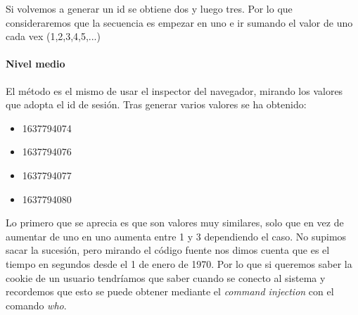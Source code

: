 Si volvemos a generar un id se obtiene dos y luego tres. Por lo que consideraremos que la secuencia es empezar en uno
e ir sumando el valor de uno cada vex (1,2,3,4,5,...)
\paragraph{Nivel medio}  El método es el mismo de usar el inspector del navegador, mirando los valores que adopta el id de 
sesión. Tras generar varios valores se ha obtenido:
\begin{itemize}
    \item 1637794074
    \item 1637794076
    \item 1637794077
    \item 1637794080
\end{itemize}

 Lo primero que se aprecia es que son valores 
muy similares, solo que en vez de aumentar de uno en uno aumenta entre 1 y 3 dependiendo el caso. No supimos sacar la sucesión, 
pero mirando el código fuente nos dimos cuenta que es el tiempo en segundos desde el 1 de enero de 1970. Por lo que si queremos saber la 
cookie de un usuario tendríamos que saber cuando se conecto al sistema y recordemos que esto se puede obtener mediante el {\it command injection} con el comando {\it who}.
